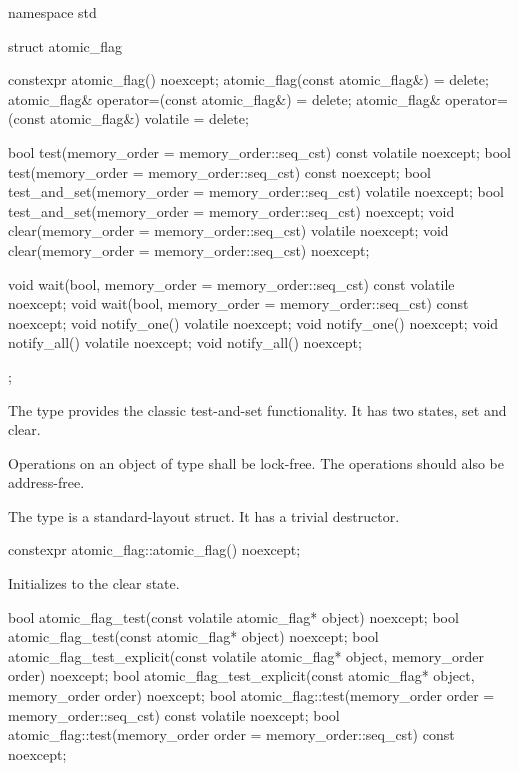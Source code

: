 \begin{codeblock}
namespace std {
  struct atomic_flag {
    constexpr atomic_flag() noexcept;
    atomic_flag(const atomic_flag&) = delete;
    atomic_flag& operator=(const atomic_flag&) = delete;
    atomic_flag& operator=(const atomic_flag&) volatile = delete;

    bool test(memory_order = memory_order::seq_cst) const volatile noexcept;
    bool test(memory_order = memory_order::seq_cst) const noexcept;
    bool test_and_set(memory_order = memory_order::seq_cst) volatile noexcept;
    bool test_and_set(memory_order = memory_order::seq_cst) noexcept;
    void clear(memory_order = memory_order::seq_cst) volatile noexcept;
    void clear(memory_order = memory_order::seq_cst) noexcept;

    void wait(bool, memory_order = memory_order::seq_cst) const volatile noexcept;
    void wait(bool, memory_order = memory_order::seq_cst) const noexcept;
    void notify_one() volatile noexcept;
    void notify_one() noexcept;
    void notify_all() volatile noexcept;
    void notify_all() noexcept;
  };
}
\end{codeblock}

\pnum
The  type provides the classic test-and-set functionality. It has two states, set and clear.

\pnum
Operations on an object of type  shall be lock-free.
The operations should also be address-free.

\pnum
The  type is a standard-layout struct.
It has a trivial destructor.

%
\begin{itemdecl}
constexpr atomic_flag::atomic_flag() noexcept;
\end{itemdecl}

\begin{itemdescr}
\pnum
\effects
Initializes  to the clear state.
\end{itemdescr}

%
%
%
\begin{itemdecl}
bool atomic_flag_test(const volatile atomic_flag* object) noexcept;
bool atomic_flag_test(const atomic_flag* object) noexcept;
bool atomic_flag_test_explicit(const volatile atomic_flag* object,
                               memory_order order) noexcept;
bool atomic_flag_test_explicit(const atomic_flag* object,
                               memory_order order) noexcept;
bool atomic_flag::test(memory_order order = memory_order::seq_cst) const volatile noexcept;
bool atomic_flag::test(memory_order order = memory_order::seq_cst) const noexcept;
\end{itemdecl}

